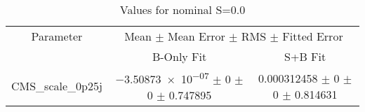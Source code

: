 \begin{table}
\centering
\caption{Values for nominal S=0.0}
\begin{tabular}{ccc}
\toprule
Parameter & \multicolumn{2}{c}{Mean $\pm$ Mean Error $\pm$ RMS $\pm$ Fitted Error}\\
 & B-Only Fit & S+B Fit\\
\midrule
CMS\_scale\_0p25j & \num{-3.50873e-07} $\pm$ \num{0} $\pm$ \num{0} $\pm$ \num{0.747895} & \num{0.000312458} $\pm$ \num{0} $\pm$ \num{0} $\pm$ \num{0.814631}\\
\bottomrule
\end{tabular}
\end{table}